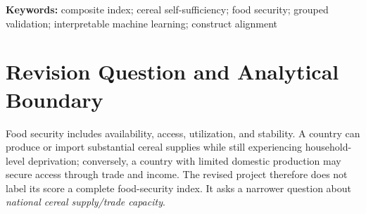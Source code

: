 \documentclass[11pt]{article}
\begin{document}
\newpage
\begin{abstract}
The original course project combined two constructed supply indicators with an annually interpolated Global Hunger Index, calibrated weights to expert category orderings, and used numerous linear, tree, and post-hoc explanation methods. This revision narrows the target to national cereal supply/trade capacity and rebuilds the analysis from preserved official-source snapshots. Capacity Score v2 combines annual percentile ranks of an SSR derived from FAOSTAT Food Balances and World Bank cereal production per person for 30 countries in 2010--2023. Weight, normalization, and temporal diagnostics show high rank robustness, while none of 101 weights reproduces all four Legacy category orderings. On six prespecified, non-component World Development Indicators over 2010--2021, Ward clustering yields an exploratory four-cluster cut dominated in part by extreme country profiles. Five-fold country-grouped evaluation gives pooled out-of-fold $R^2=-0.231$ for ordinary least squares and $R^2=0.319$ for a fixed shallow random forest, with substantial fold heterogeneity. Arable land per person is the only feature with positive held-out permutation importance in every fold. Country-median v2 scores have modest inverse rank associations with official PoU and FIES. The reconstruction therefore supports a transparent descriptive capacity index and cautious model attribution, but not a forecast, causal model, or comprehensive measure of food security.
\end{abstract}

\textbf{Keywords:} composite index; cereal self-sufficiency; food security; grouped validation; interpretable machine learning; construct alignment

\tableofcontents
\clearpage
{}

\section{Revision Question and Analytical Boundary}

Food security includes availability, access, utilization, and stability. A country can produce or import substantial cereal supplies while still experiencing household-level deprivation; conversely, a country with limited domestic production may secure access through trade and income. The revised project therefore does not label its score a complete food-security index. It asks a narrower question about \emph{national cereal supply/trade capacity}.
\end{document}
